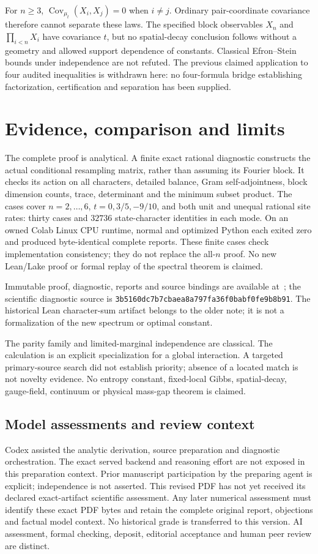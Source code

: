 \documentclass[11pt]{article}
\newcommand{\Cov}{\operatorname{Cov}}
\begin{document}
For $n\ge3$, $\Cov_{\mu_t}(X_i,X_j)=0$ when $i\ne j$.
Ordinary pair-coordinate covariance therefore cannot separate these
laws. The specified block observables $X_n$ and $\prod_{i<n}X_i$
have covariance $t$, but no spatial-decay conclusion follows without
a geometry and allowed support dependence of constants.
Classical Efron--Stein bounds under independence are not refuted.
The previous claimed application to four audited inequalities is
withdrawn here: no four-formula bridge establishing factorization,
certification and separation has been supplied.

\section{Evidence, comparison and limits}
The complete proof is analytical. A finite exact rational diagnostic
constructs the actual conditional resampling matrix, rather than
assuming its Fourier block. It checks its action on all characters,
detailed balance, Gram self-adjointness, block dimension counts,
trace, determinant and the minimum subset product. The cases cover
$n=2,\ldots,6$, $t=0,3/5,-9/10$, and both unit and unequal rational
site rates: thirty cases and $32736$ state-character identities in
each mode. On an owned Colab Linux CPU runtime, normal and optimized
Python each exited zero and produced byte-identical complete reports.
These finite cases check implementation consistency; they do not
replace the all-$n$ proof. No new Lean/Lake proof or formal replay
of the spectral theorem is claimed.

Immutable proof, diagnostic, reports and source bindings are available
at~\cite{Artifacts}; the scientific diagnostic source is
\texttt{3b5160dc7b7cbaea8a797fa36f0babf0fe9b8b91}.
The historical Lean character-sum artifact belongs to the older note;
it is not a formalization of the new spectrum or optimal constant.

The parity family and limited-marginal independence are classical.
The calculation is an explicit specialization for a global interaction.
A targeted primary-source search did not establish priority; absence
of a located match is not novelty evidence. No entropy constant,
fixed-local Gibbs, spatial-decay, gauge-field, continuum or physical
mass-gap theorem is claimed.

\subsection*{Model assessments and review context}
Codex assisted the analytic derivation, source preparation and
diagnostic orchestration. The exact served backend and reasoning
effort are not exposed in this preparation context. Prior manuscript
participation by the preparing agent is explicit; independence is
not asserted. This revised PDF has not yet received its declared
exact-artifact scientific assessment. Any later numerical assessment
must identify these exact PDF bytes and retain the complete original
report, objections and factual model context. No historical grade is
transferred to this version. AI assessment, formal checking,
deposit, editorial acceptance and human peer review are distinct.
\end{document}
